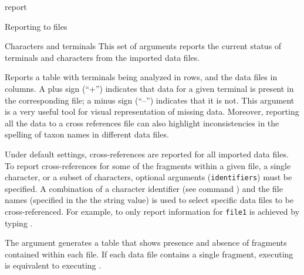 \begin{command}{report}{}
\begin{arguments}
\begin{argumentgroup}{Reporting to files}{}
        \end{argumentgroup}
                
        \begin{argumentgroup}{Characters and terminals}
            {This set of arguments reports the current status of terminals and
            characters from the imported data files. }
        

                {Reports a table with terminals being analyzed in rows, and the
                data files in columns. A plus sign (``+'') indicates that data for a given
                terminal is
                present in the corresponding file; a minus sign (``--'') indicates that it is
                not. This argument is a very useful tool for visual
                representation of missing data.  Moreover, reporting all the data to a 
                cross references file can also highlight inconsistencies in the spelling 
                of taxon names in different data files.
                
                \indent Under default settings, cross-references are reported for
                all imported data files. To report cross-references for some of
                the fragments within a given file, a single character, or a subset
                of characters, optional arguments (\texttt{identifiers}) must be specified. A combination of
                a character identifier (see command  ) and
                the file names (specified in the the string value) is used to select specific
                data files to be cross-referenced. For example, to only report information  
                for \texttt{file1}  is achieved by typing .
                
                \indent The argument  generates
                a table that shows presence and absence of fragments contained
                within each file. If each data file contains a
                single fragment,  executing 
                is equivalent to executing .
                
}
\end{argumentgroup}
\end{arguments}
\end{command}
